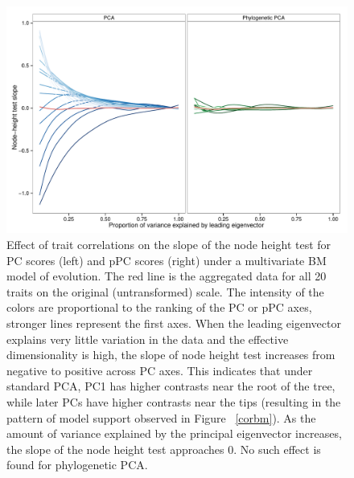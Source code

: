 \documentclass[a4paper,11pt]{article}
\begin{document}
\begin{figure}[p]
\centering
\includegraphics[scale=0.65]{./fig/onion.pdf}
\caption{Effect of trait correlations on the slope of the node height test for PC scores (left) and pPC scores (right) under a multivariate BM model of evolution. The red line is the aggregated data for all 20 traits on the original (untransformed) scale. The intensity of the colors are proportional to the ranking of the PC or pPC axes, stronger lines represent the first axes. When the leading eigenvector explains very little variation in the data and the effective dimensionality is high, the slope of node height test increases from negative to positive across PC axes. This indicates that under standard PCA, PC1 has higher contrasts near the root of the tree, while later PCs have higher contrasts near the tips (resulting in the pattern of model support observed in Figure ~\ref{corbm}). As the amount of variance explained by the principal eigenvector increases, the slope of the node height test approaches 0. No such effect is found for phylogenetic PCA.}
\label{rank}
\end{figure}
\end{document}

